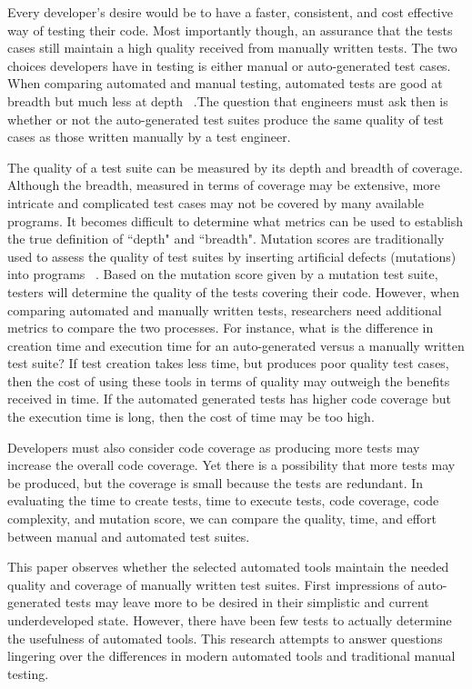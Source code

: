 Every developer's desire would be to have a faster, consistent, and cost effective way of testing their code. Most importantly though, an assurance that the tests cases still maintain a high quality received from manually written tests. The two choices developers have in testing is either manual or auto-generated test cases. When comparing automated and manual testing, automated tests are good at breadth but much less at depth ~\cite{4076909}.The question that engineers must ask then is whether or not the auto-generated test suites produce the same quality of test cases as those written manually by a test engineer. 

The quality of a test suite can be measured by its depth and breadth of coverage. Although the breadth, measured in terms of coverage may be extensive, more intricate and complicated test cases may not be covered by many available programs. It becomes difficult to determine what metrics can be used to establish the true definition of ``depth" and ``breadth". Mutation scores are traditionally used to assess the quality of test suites by inserting artificial defects (mutations) into programs ~\cite{Fraser:2010:MGU:1831708.1831728}. Based on the mutation score given by a mutation test suite, testers will determine the quality of the tests covering their code. However, when comparing automated and manually written tests, researchers need additional metrics to compare the two processes. For instance, what is the difference in creation time and execution time for an auto-generated versus a manually written test suite? If test creation takes less time, but produces poor quality test cases, then the cost of using these tools in terms of quality may outweigh the benefits received in time. If the automated generated tests has higher code coverage but the execution time is long, then the cost of time may be too high. 

Developers must also consider code coverage as producing more tests may increase the overall code coverage. Yet there is a possibility that more tests may be produced, but the coverage is small because the tests are redundant. In evaluating the time to create tests, time to execute tests, code coverage, code complexity, and mutation score, we can compare the quality, time, and effort between manual and automated test suites.

This paper observes whether the selected automated tools maintain the needed quality and coverage of manually written test suites. First impressions of auto-generated tests may leave more to be desired in their simplistic and current underdeveloped state. However, there have been few tests to actually determine the usefulness of automated tools. This research attempts to answer questions lingering over the differences in modern automated tools and traditional manual testing.

